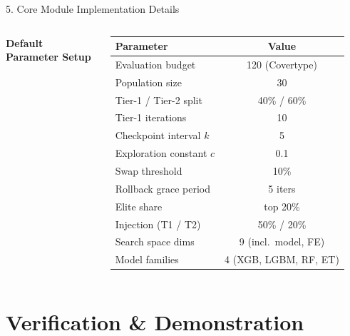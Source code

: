 \documentclass[aspectratio=169, 11pt]{beamer}
\begin{document}
\begin{frame}{5. Core Module Implementation Details}
\begin{columns}[T]
        \centering
        {\scriptsize \textbf{\textcolor{amritaMaroon}{Default Parameter Setup}}}
        \vspace{0.05cm}
        \begin{table}
            \centering
            \tiny
            \renewcommand{\arraystretch}{1.0}
            \begin{tabular}{lc}
                \toprule
                \textbf{Parameter} & \textbf{Value} \\
                \midrule
                Evaluation budget & 120 (Covertype) \\
                Population size & 30 \\
                Tier-1 / Tier-2 split & 40\% / 60\% \\
                Tier-1 iterations & 10 \\
                Checkpoint interval $k$ & 5 \\
                Exploration constant $c$ & 0.1 \\
                Swap threshold & 10\% \\
                Rollback grace period & 5 iters \\
                Elite share & top 20\% \\
                Injection (T1 / T2) & 50\% / 20\% \\
                Search space dims & 9 (incl.\ model, FE) \\
                Model families & 4 (XGB, LGBM, RF, ET) \\
                \bottomrule
            \end{tabular}
        \end{table}
    \end{columns}
\end{frame}

\section{Verification \& Demonstration}
\end{document}
